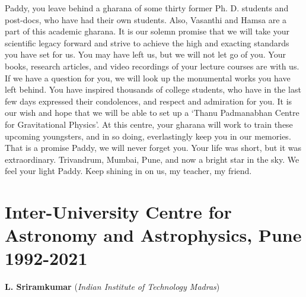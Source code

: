 \documentclass[prd, preprint, longbibliography, 12pt]{revtex4-2}
\begin{document}
Paddy, you leave behind a gharana of some thirty former Ph. D. students and post-docs, who have had their own students. Also, Vasanthi and Hamsa are  a part of this academic gharana. It is our solemn promise that we will take your scientific legacy forward and strive to achieve the high and exacting standards you have set for us. You may have left us, but we will not let go of you. Your books, research articles, and video recordings of your lecture courses are with us. If we have a question for you, we will look up the monumental works you have left behind. You have inspired thousands of college students, who have in the last few days expressed their condolences, and respect and admiration for you. It is our wish and hope that we will be able to set up a `Thanu Padmanabhan Centre for Gravitational Physics’. At this centre, your gharana will work to train these upcoming youngsters, and in so doing, everlastingly keep you in our memories. That is a promise Paddy, we will never forget you. Your life was short, but it was extraordinary. Trivandrum, Mumbai, Pune, and now a bright star in the sky. We feel your light Paddy. Keep shining in on us, my teacher, my friend.

\section{Inter-University Centre for Astronomy and Astrophysics, Pune 1992-2021} 

\centerline{{\bf L. Sriramkumar} ({\it Indian Institute of Technology Madras})}
\medskip
{}

\noindent
\end{document}
